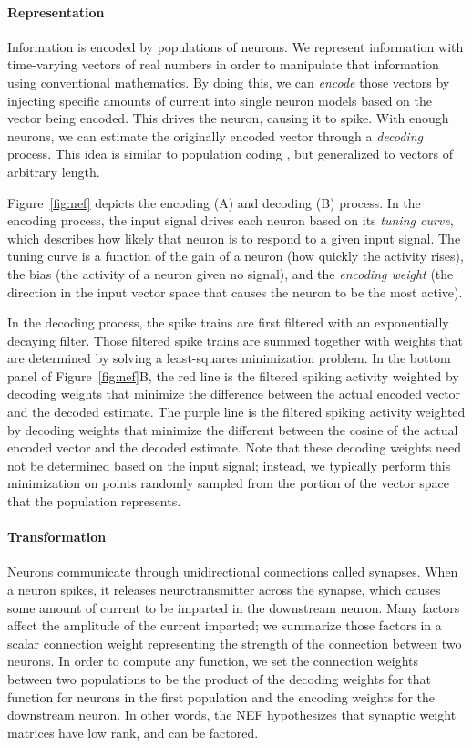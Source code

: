 \documentclass{frontiersSCNS}
\begin{document}
\paragraph{Representation}
Information is encoded by populations of neurons.
We represent information
with time-varying vectors of real numbers
in order to manipulate that information
using conventional mathematics.
By doing this, we can \textit{encode}
those vectors by injecting
specific amounts of current into
single neuron models based on
the vector being encoded.
This drives the neuron,
causing it to spike.
With enough neurons,
we can estimate the originally encoded vector
through a \textit{decoding} process.
This idea is similar to population coding
\cite{TODO}, but generalized
to vectors of arbitrary length.

Figure~\ref{fig:nef} depicts
the encoding (A) and decoding (B) process.
In the encoding process, the input signal drives
each neuron based on its \textit{tuning curve},
which describes how likely
that neuron is to respond to a given input signal.
The tuning curve is a function of the gain
of a neuron (how quickly the activity rises),
the bias (the activity of a neuron given no signal),
and the \textit{encoding weight}
(the direction in the input vector space
that causes the neuron to be the most active).

In the decoding process,
the spike trains are first filtered
with an exponentially decaying filter.
Those filtered spike trains are summed together
with weights that are determined
by solving a least-squares minimization problem.
In the bottom panel of Figure~\ref{fig:nef}B,
the red line is the filtered spiking activity
weighted by decoding weights
that minimize the difference between
the actual encoded vector
and the decoded estimate.
The purple line is the filtered spiking activity
weighted by decoding weights
that minimize the different between
the cosine of the actual encoded vector
and the decoded estimate.
Note that these decoding weights
need not be determined
based on the input signal;
instead, we typically perform
this minimization on points
randomly sampled from
the portion of the vector space
that the population represents.

\paragraph{Transformation}  %
Neurons communicate through
unidirectional connections called synapses.
When a neuron spikes,
it releases neurotransmitter across the synapse,
which causes some amount of current
to be imparted in the downstream neuron.
Many factors affect the
amplitude of the current imparted;
we summarize those factors
in a scalar connection weight
representing the strength
of the connection between two neurons.
In order to compute any function,
we set the connection weights between
two populations to be the product of
the decoding weights for that function
for neurons in the first population
and the encoding weights
for the downstream neuron.
In other words, the NEF hypothesizes
that synaptic weight matrices
have low rank, and can be factored.
\end{document}
